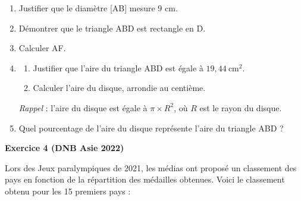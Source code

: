 \documentclass{article}
\begin{document}
\begin{center}
\end{center}

\medskip

\begin{enumerate}
\item Justifier que le diamètre [AB] mesure 9 cm.
\item Démontrer que le triangle ABD est rectangle en D.
\item Calculer AF{}.
\item 
	\begin{enumerate}
		\item Justifier que l'aire du triangle ABD est égale à $19,44~\text{cm}^2$.
		\item Calculer l'aire du disque, arrondie au centième.
	\end{enumerate}
	
\emph{Rappel} : l'aire du disque est égale à $\pi \times R^2$, où $R$ est le rayon du disque. 
\item Quel pourcentage de l'aire du disque représente l'aire du triangle ABD ?
\end{enumerate}

\bigskip\newpage
\textbf{Exercice 4 (DNB Asie 2022)}\par
\medskip
Lors des Jeux paralympiques de 2021, les médias ont proposé un classement des pays en
fonction de la répartition des médailles obtenues. Voici le classement obtenu pour les 15 premiers pays :
\end{document}
